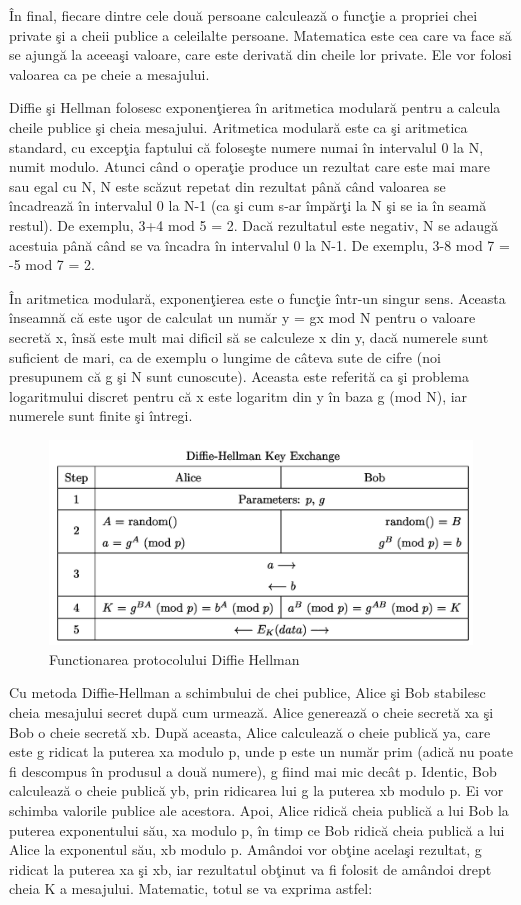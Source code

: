 \documentclass[12pt, a4paper, oneside, romanian]{teza-upb}
\begin{document}
În final, fiecare dintre cele două persoane calculează o funcţie a propriei chei private şi a cheii publice a celeilalte persoane. Matematica este cea care va face să se ajungă la aceeaşi valoare, care este derivată din cheile lor private. Ele vor folosi valoarea ca pe cheie a mesajului.

Diffie şi Hellman folosesc exponenţierea în aritmetica modulară pentru a calcula cheile publice şi cheia mesajului. Aritmetica modulară este ca şi aritmetica standard, cu excepţia faptului că foloseşte numere numai în intervalul 0 la N, numit modulo. Atunci când o operaţie produce un rezultat care este mai mare sau egal cu N, N este scăzut repetat din rezultat până când valoarea se încadrează în intervalul 0 la N-1 (ca şi cum s-ar împărţi la N şi se ia în seamă restul). De exemplu, 3+4 mod 5 = 2. Dacă rezultatul este negativ, N se adaugă acestuia până când se va încadra în intervalul 0 la N-1. De exemplu, 3-8 mod 7 = -5 mod 7 = 2.

În aritmetica modulară, exponenţierea este o funcţie într-un singur sens.
Aceasta înseamnă că este uşor de calculat un număr y = gx mod N pentru o valoare secretă x, însă este mult mai dificil să se calculeze x din y, dacă numerele sunt suficient de mari, ca de exemplu o lungime de câteva sute de cifre (noi presupunem că g şi N sunt cunoscute). Aceasta este referită ca şi problema logaritmului discret pentru că x este logaritm din y în baza g (mod N), iar numerele sunt finite şi întregi.
\begin{figure}[tb]
\centering
\includegraphics*[scale=0.3]{img/dhke.png}
\caption{Functionarea protocolului Diffie Hellman}
\label{fig:punguta}
\end{figure}
Cu metoda Diffie-Hellman a schimbului de chei publice, Alice şi Bob stabilesc cheia mesajului secret după cum urmează. Alice generează o cheie secretă xa şi Bob o cheie secretă xb. După aceasta, Alice calculează o cheie publică ya, care este g ridicat la puterea xa modulo p, unde p este un număr prim (adică nu poate fi descompus în produsul a două numere), g fiind mai mic decât p. Identic, Bob calculează o cheie publică yb, prin ridicarea lui g la puterea xb modulo p. Ei vor schimba valorile publice ale acestora. Apoi, Alice ridică cheia publică a lui Bob la puterea exponentului său, xa modulo p, în timp ce Bob ridică cheia publică a lui Alice la exponentul său, xb modulo p. Amândoi vor obţine acelaşi rezultat, g ridicat la puterea xa şi xb, iar rezultatul obţinut va fi folosit de amândoi drept cheia K a mesajului. Matematic, totul se va exprima astfel:
\end{document}
